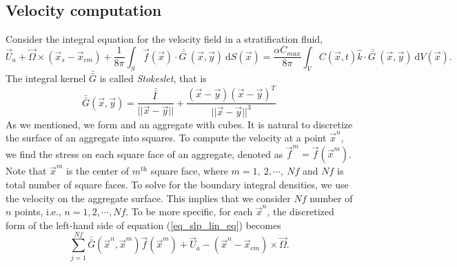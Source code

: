 
 \subsection{Velocity computation}
 Consider the integral equation for the velocity field in a stratification fluid,
 \begin{equation}
	\vec{U}_a + \vec{\Omega} \times (\vec{x}_s - \vec{x}_{cm})
 		  + \frac{1}{8 \pi} \int_{S}
 		 \vec{f}(\vec{x})
 		 \cdot \bar{\bar{G \ }} (\vec{x},\vec{y})
 		 \ \textrm{d}S(\vec{x})
 		=
		  \frac{ \alpha  C_{max}}{8\pi } \int_{V}
 		C(\vec{x}, t ) \hat{k} \cdot
 		\bar{\bar{G \ }} (\vec{x}, \vec{y})
 		\  \textrm{d}V(\vec{x}).
 \label{eq_slp_lin_eq}
 \end{equation}
 The integral kernel $\bar{\bar{G }} $ is called \textit{Stokeslet}, that is 
 \begin{equation}
 	\bar{\bar{G}}( \vec{x}, \vec{y}) = 
 	\frac{\bar{\bar{I \ }}}{||\vec{x}-\vec{y}||} + \frac{(\vec{x}-\vec{y})(\vec{x}-\vec{y})^T}{||\vec{x}-\vec{y}||^3}
 \end{equation}
As we mentioned, we form and an aggregate with cubes. It is natural to discretize the surface of an aggregate into squares. 
To compute the velocity at a point $\vec{x}^n$, we find the stress on each square face of an aggregate, denoted as $\vec{f}^m = \vec{f}(\vec{x}^m)$. Note that $\vec{x}^m$ is the center of $m^{\text{th}}$ square face, where $m = 1, \ 2, \cdots, \ Nf$ and $Nf$ is total number of square faces.
To solve for the boundary integral densities, we use the velocity on the aggregate surface. This implies that we consider $Nf$ number of $n$ points, i.e., $n = 1,2, \cdots, Nf$. To be more specific, for each $\vec{x}^n$, the discretized form of the left-hand side of equation (\ref{eq_slp_lin_eq}) becomes
\begin{equation}
\sum_{j = 1}^{Nf}
	 \bar{\bar{G}}(\vec{x}^n,  \vec{x}^m)  \vec{f}(\vec{x}^m)
	+ \vec{U}_a - 
	(\vec{x}^n - \vec{x}_{cm}) \times \vec{\Omega}.
\end{equation}

